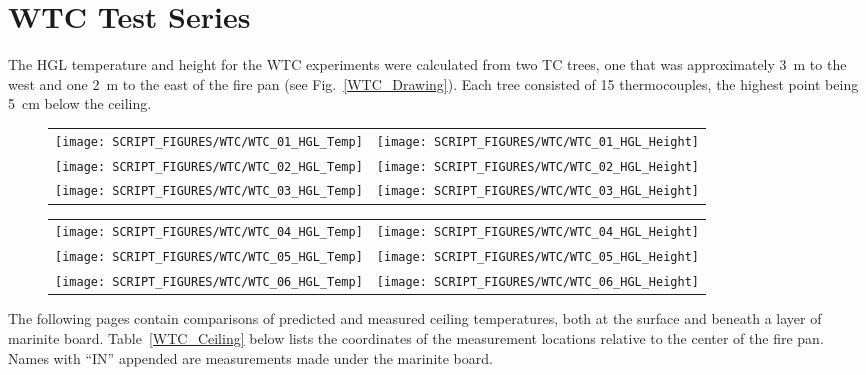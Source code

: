 \clearpage

\section{WTC Test Series}

The HGL temperature and height for the WTC experiments were calculated from two TC trees, one that was approximately 3~m to the west and one 2~m to the east of the fire pan (see Fig.~\ref{WTC_Drawing}). Each tree consisted of 15 thermocouples, the highest point being 5~cm below the ceiling.

\begin{figure}[h!]
\begin{tabular*}{\textwidth}{l@{\extracolsep{\fill}}r}
\texttt{[image: SCRIPT\_FIGURES/WTC/WTC\_01\_HGL\_Temp]} &
\texttt{[image: SCRIPT\_FIGURES/WTC/WTC\_01\_HGL\_Height]} \\
\texttt{[image: SCRIPT\_FIGURES/WTC/WTC\_02\_HGL\_Temp]} &
\texttt{[image: SCRIPT\_FIGURES/WTC/WTC\_02\_HGL\_Height]} \\
\texttt{[image: SCRIPT\_FIGURES/WTC/WTC\_03\_HGL\_Temp]} &
\texttt{[image: SCRIPT\_FIGURES/WTC/WTC\_03\_HGL\_Height]}
\end{tabular*}
\end{figure}

\begin{figure}[p]
\begin{tabular*}{\textwidth}{l@{\extracolsep{\fill}}r}
\texttt{[image: SCRIPT\_FIGURES/WTC/WTC\_04\_HGL\_Temp]} &
\texttt{[image: SCRIPT\_FIGURES/WTC/WTC\_04\_HGL\_Height]} \\
\texttt{[image: SCRIPT\_FIGURES/WTC/WTC\_05\_HGL\_Temp]} &
\texttt{[image: SCRIPT\_FIGURES/WTC/WTC\_05\_HGL\_Height]} \\
\texttt{[image: SCRIPT\_FIGURES/WTC/WTC\_06\_HGL\_Temp]} &
\texttt{[image: SCRIPT\_FIGURES/WTC/WTC\_06\_HGL\_Height]}
\end{tabular*}
\end{figure}

\clearpage

The following pages contain comparisons of predicted and measured ceiling temperatures, both at the surface and beneath a layer of marinite board. Table~\ref{WTC_Ceiling} below lists the coordinates of the measurement locations relative to the center of the fire pan. Names with ``IN'' appended are measurements made under the marinite board.


